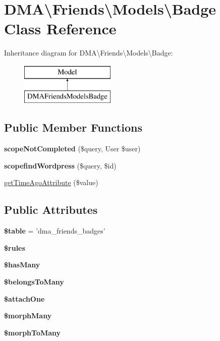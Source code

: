 \hypertarget{classDMA_1_1Friends_1_1Models_1_1Badge}{\section{D\+M\+A\textbackslash{}Friends\textbackslash{}Models\textbackslash{}Badge Class Reference}
\label{classDMA_1_1Friends_1_1Models_1_1Badge}
}
Inheritance diagram for D\+M\+A\textbackslash{}Friends\textbackslash{}Models\textbackslash{}Badge\+:\begin{figure}[H]
\begin{center}
\leavevmode
\includegraphics[height=2.000000cm]{df/d98/classDMA_1_1Friends_1_1Models_1_1Badge}
\end{center}
\end{figure}
\subsection*{Public Member Functions}
\begin{DoxyCompactItemize}
\item 
\hypertarget{classDMA_1_1Friends_1_1Models_1_1Badge_a65fc600bfefbedc8d7393ec86c848a51}{{\bfseries scope\+Not\+Completed} (\$query, User \$user)}\label{classDMA_1_1Friends_1_1Models_1_1Badge_a65fc600bfefbedc8d7393ec86c848a51}

\item 
\hypertarget{classDMA_1_1Friends_1_1Models_1_1Badge_a5ebdc91135362ca2b0225fdb0c965127}{{\bfseries scopefind\+Wordpress} (\$query, \$id)}\label{classDMA_1_1Friends_1_1Models_1_1Badge_a5ebdc91135362ca2b0225fdb0c965127}

\item 
\hyperlink{classDMA_1_1Friends_1_1Models_1_1Badge_a628b0da2969e586837ad98fecf12ee71}{get\+Time\+Ago\+Attribute} (\$value)
\end{DoxyCompactItemize}
\subsection*{Public Attributes}
\begin{DoxyCompactItemize}
\item 
\hypertarget{classDMA_1_1Friends_1_1Models_1_1Badge_aa58560300753d15561b1a979aa21b8fd}{{\bfseries \$table} = 'dma\+\_\+friends\+\_\+badges'}\label{classDMA_1_1Friends_1_1Models_1_1Badge_aa58560300753d15561b1a979aa21b8fd}

\item 
{\bfseries \$rules}
\item 
{\bfseries \$has\+Many}
\item 
{\bfseries \$belongs\+To\+Many}
\item 
{\bfseries \$attach\+One}
\item 
{\bfseries \$morph\+Many}
\item 
{\bfseries \$morph\+To\+Many}
\end{DoxyCompactItemize}
